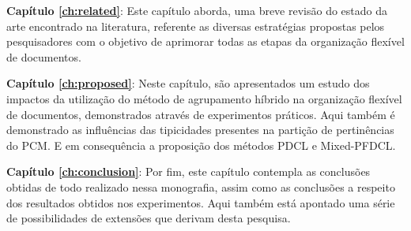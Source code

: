 {\bf Capítulo \ref{ch:related}\/}: Este capítulo aborda, uma breve revisão do estado da arte encontrado
na literatura, referente as diversas estratégias propostas pelos pesquisadores com o objetivo de
aprimorar todas as etapas da organização flexível de documentos. 

{\bf Capítulo \ref{ch:proposed}\/}: Neste capítulo, são apresentados um estudo dos impactos da
utilização do método de agrupamento híbrido na organização flexível de documentos, demonstrados
através de experimentos práticos. Aqui também é demonstrado as influências das tipicidades presentes
na partição de pertinências do PCM. E em consequência a proposição dos métodos PDCL e Mixed-PFDCL. 

{\bf Capítulo \ref{ch:conclusion}\/}: Por fim, este capítulo contempla as conclusões obtidas de todo
realizado nessa monografia, assim como as conclusões a respeito dos resultados obtidos nos
experimentos. Aqui também está apontado uma série de possibilidades de extensões que derivam desta
pesquisa. 
